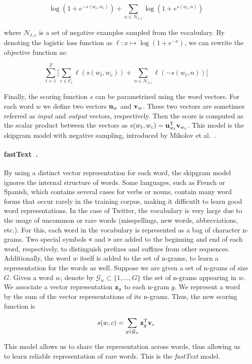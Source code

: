 $$ \log (1 + \mathit{e}^{-s(w_t, w_c)}) + \sum_{n\in \mathcal{N}_{t,c}} \log(1 + \mathit{e}^{s(w_t, n)})$$

\noindent where $\mathcal{N}_{t,c}$ is a set of negative examples sampled from
the vocabulary. 
%
By denoting the logistic loss function as $\ell : x \mapsto \log(1+\mathit{e}^{-x})$, we
can rewrite the objective function as:

$$\sum_{t=1}^T \Big[ \sum_{c\in\mathcal{C}_t} \ell(s(w_t, w_c)) + \sum_{n\in\mathcal{N}_{t,c}}\ell(-s(w_t, n))\Big]$$

Finally, the scoring function $s$ can be parametrized using the word vectors. 
%
For each word $w$ we define two vectors $\boldsymbol{\mathbf{u}}_w$ and $\boldsymbol{\mathbf{v}}_w$.
%
These two vectors are sometimes referred as {\em input} and {\em output}
vectors, respectively.
%
Then the score is computed as the scalar product between the vectors as $s(w_t,
w_c) = \boldsymbol{\mathbf{u}}^\text{T}_{w_t}\boldsymbol{\mathbf{v}}_{w_c}$.
%
This model is the skipgram model with negative sampling, introduced by Mikolov
et al.~\cite{mikolov2013distributed}.


\paragraph{fastText~\cite{bojanowski2017enriching}.} 
By using a distinct vector representation for each word, the skipgram model
ignores the internal structure of words. 
%
Some languages, such as French or Spanish, which contains several cases for
verbs or nouns, contain many word forms that occur rarely in the training
corpus, making it difficutlt to learn good word representations.
%
In the case of Twitter, the vocabulary is very large due to the usage of
uncommon or rare words (misspellings, new words, abbreviations, etc.).
%
For this, each word in the vocabulary is represented as a bag of character
n-grams. 
%
Two special symbols {\tt <} and {\tt >} are added to the beginning and end of
each word, respectively, to distinguish prefixes and suffixes from other
sequences.
%
Additionally, the word $w$ itself is added to the set of n-grams, to learn a
representation for the words as well. 
%
Suppose we are given a set of n-grams of size $G$. 
%
Given a word $w$, denote by $\mathcal{G}_w \subset \{1, \ldots, G\}$ the set of
n-grams appearing in $w$.
%
We associate a vector representation $\boldsymbol{\mathbf{z}}_g$ to each n-gram $g$. 
%
We represent a word by the sum of the vector representations of its n-grams.
%
Thus, the new scoring function is

$$s(w, c) = \sum_{g\in\mathcal{G}_w}\boldsymbol{\mathbf{z}}^\text{T}_g\boldsymbol{\mathbf{v}}_c$$

This model allows us to share the representation across words, thus allowing us
to learn reliable representation of rare words.
%
This is the {\em fastText} model.